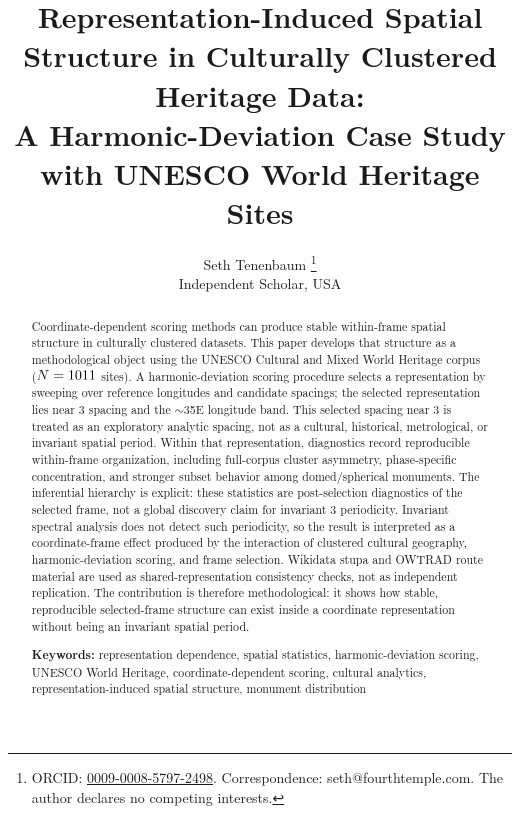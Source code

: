 \documentclass[12pt,a4paper]{article}
\begin{document}

\title{Representation-Induced Spatial Structure in Culturally Clustered
Heritage Data:\\[4pt]
A Harmonic-Deviation Case Study with UNESCO World Heritage Sites}

\author{Seth Tenenbaum%
  \thanks{ORCID: \href{https://orcid.org/0009-0008-5797-2498}{0009-0008-5797-2498}.
  Correspondence: seth@fourthtemple.com. The author declares no competing interests.}\\[2pt]
  \small Independent Scholar, USA}

\date{}
\maketitle

\begin{abstract}

Coordinate-dependent scoring methods can produce stable within-frame
spatial structure in culturally clustered datasets.
This paper develops that structure as a methodological object using the
UNESCO Cultural and Mixed World Heritage corpus ($N = 1011$ sites).
A harmonic-deviation scoring procedure selects a representation by sweeping
over reference longitudes and candidate spacings; the selected representation
lies near 3\textdegree{} spacing and the $\sim$35\textdegree{}E longitude
band. This selected spacing near 3\textdegree{} is treated as an exploratory
analytic spacing, not as a cultural, historical, metrological, or invariant
spatial period. Within that representation, diagnostics record reproducible
within-frame organization, including full-corpus cluster asymmetry,
phase-specific concentration, and stronger subset behavior among
domed/spherical monuments. The inferential hierarchy is explicit: these
statistics are post-selection diagnostics of the selected frame, not a global
discovery claim for invariant 3\textdegree{} periodicity. Invariant spectral
analysis does not detect such periodicity, so the result is interpreted as a
coordinate-frame effect produced by the interaction of clustered cultural
geography, harmonic-deviation scoring, and frame selection. Wikidata stupa
and OWTRAD route material are used as shared-representation consistency
checks, not as independent replication. The contribution is therefore
methodological: it shows how stable, reproducible selected-frame structure can
exist inside a coordinate representation without being an invariant spatial
period.

\bigskip\noindent\textbf{Keywords:}
representation dependence, spatial statistics, harmonic-deviation scoring,
UNESCO World Heritage, coordinate-dependent scoring, cultural analytics,
representation-induced spatial structure, monument distribution

\end{abstract}
\end{document}

